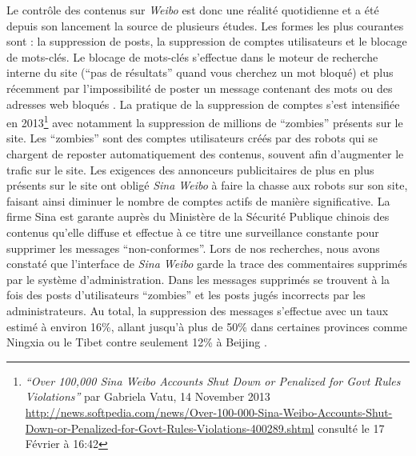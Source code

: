 Le contrôle des contenus sur \textit{Weibo} est donc une réalité quotidienne et a été depuis son lancement la source de plusieurs études. Les formes les plus courantes sont : la suppression de posts, la suppression de comptes utilisateurs et le blocage de mots-clés. Le blocage de mots-clés s’effectue dans le moteur de recherche interne du site (“pas de résultats” quand vous cherchez un mot bloqué) et plus récemment par l’impossibilité de poster un message contenant des mots ou des adresses web bloqués \citep{Ng2013}. La pratique de la suppression de comptes s’est intensifiée en 2013\footnote{ \textit{“Over 100,000 \textit{Sina Weibo} Accounts Shut Down or Penalized for Govt Rules Violations”} par Gabriela Vatu, 14 November 2013 \url{http://news.softpedia.com/news/Over-100-000-Sina-Weibo-Accounts-Shut-Down-or-Penalized-for-Govt-Rules-Violations-400289.shtml} consulté le 17 Février à 16:42} avec notamment la suppression de millions de “zombies” présents sur le site. Les “zombies” sont des comptes utilisateurs créés par des robots qui se chargent de reposter automatiquement des contenus, souvent afin d’augmenter le trafic sur le site. Les exigences des annonceurs publicitaires de plus en plus présents sur le site ont obligé \textit{Sina Weibo} à faire la chasse aux robots sur son site, faisant ainsi diminuer le nombre de comptes actifs de manière significative. La firme Sina est garante auprès du Ministère de la Sécurité Publique chinois des contenus qu’elle diffuse et effectue à ce titre une surveillance constante pour supprimer les messages “non-conformes”. Lors de nos recherches, nous avons constaté que l’interface de \textit{Sina Weibo} garde la trace des commentaires supprimés par le système d’administration. Dans les messages supprimés se trouvent à la fois des posts d’utilisateurs “zombies” et les posts jugés incorrects par les administrateurs. Au total, la suppression des messages s’effectue avec un taux estimé à environ 16\%, allant jusqu’à plus de 50\% dans certaines provinces comme Ningxia ou le Tibet contre seulement 12\% à Beijing \citep{Bamman2012}.


